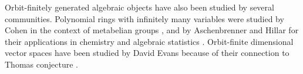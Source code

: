 \documentclass[a4paper,11pt]{article}
\begin{document}
Orbit-finitely generated algebraic objects have also been studied by several communities.
Polynomial rings with infinitely many variables were studied by Cohen in the context of metabelian groups \cite{Cohen67},
and by Aschenbrenner and Hillar for their applications in chemistry and algebraic statistics \cite{AH04}.
Orbit-finite dimensional vector spaces have been studied by David Evans because of their connection to Thomas conjecture \cite{CE91,homOFR25}.
%
%
%
%
%
%
%
\end{document}
